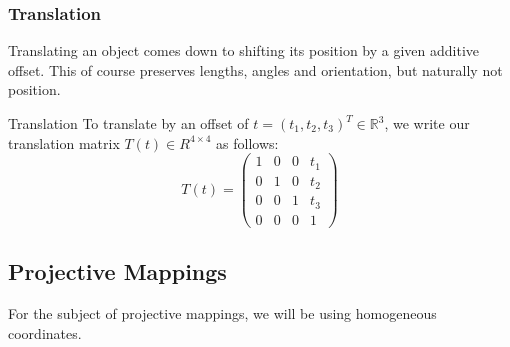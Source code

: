 \documentclass{panikzettel}
\begin{document}
\begin{halfboxl}
\vspace{-\baselineskip}
\subsubsection*{Translation}

Translating an object comes down to shifting its position by a given additive offset. This of course preserves lengths, angles and orientation, but naturally not position.
\end{halfboxl}%
\begin{halfboxr}
\vspace{-\baselineskip}
\begin{defi}{Translation}
To translate by an offset of \linebreak $t=(t_1, t_2, t_3)^T \in \mathbb{R}^3$, we write our translation matrix $T(t)\in R^{4 \times 4}$ as follows:
$$T(t)=\begin{pmatrix}
1 & 0 & 0 & t_1 \\ 0 & 1 & 0 & t_2 \\ 0 & 0 & 1 & t_3 \\ 0 & 0 & 0 & 1
\end{pmatrix}$$
\end{defi}
\end{halfboxr}

\subsection{Projective Mappings}

For the subject of projective mappings, we will be using homogeneous coordinates.
\end{document}
